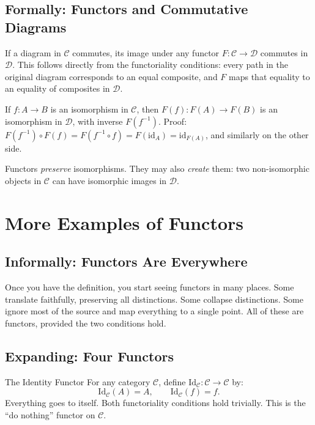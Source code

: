 \subsection{Formally: Functors and Commutative Diagrams}

If a diagram in $\mathcal{C}$ commutes, its image under any functor
$F : \mathcal{C} \to \mathcal{D}$ commutes in $\mathcal{D}$. This follows
directly from the functoriality conditions: every path in the original
diagram corresponds to an equal composite, and $F$ maps that equality to
an equality of composites in $\mathcal{D}$.

If $f : A \to B$ is an isomorphism in $\mathcal{C}$, then $F(f) : F(A) \to
F(B)$ is an isomorphism in $\mathcal{D}$, with inverse $F(f^{-1})$.
Proof: $F(f^{-1}) \circ F(f) = F(f^{-1} \circ f) = F(\mathrm{id}_A) =
\mathrm{id}_{F(A)}$, and similarly on the other side.

Functors \emph{preserve} isomorphisms. They may also \emph{create} them:
two non-isomorphic objects in $\mathcal{C}$ can have isomorphic images in
$\mathcal{D}$.


\section{More Examples of Functors}
\label{sec:functor-examples}

\subsection{Informally: Functors Are Everywhere}

Once you have the definition, you start seeing functors in many places. Some
translate faithfully, preserving all distinctions. Some collapse distinctions.
Some ignore most of the source and map everything to a single point. All of
these are functors, provided the two conditions hold.

\subsection{Expanding: Four Functors}

\begin{example}{The Identity Functor}
For any category $\mathcal{C}$, define $\mathrm{Id}_\mathcal{C} :
\mathcal{C} \to \mathcal{C}$ by:
\[
  \mathrm{Id}_\mathcal{C}(A) = A, \qquad \mathrm{Id}_\mathcal{C}(f) = f.
\]
Everything goes to itself. Both functoriality conditions hold trivially.
This is the ``do nothing'' functor on $\mathcal{C}$.
\end{example}

